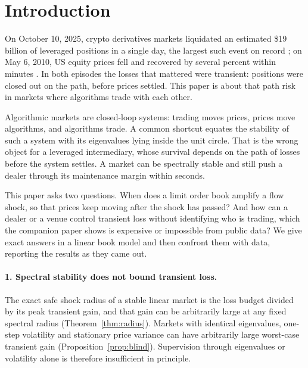 \documentclass[12pt]{article}
\theoremstyle{definition}
\theoremstyle{remark}
\begin{document}
\section{Introduction}

On October 10, 2025, crypto derivatives markets liquidated an estimated \$19 billion of leveraged positions in a single day, the largest such event on record \citep{shares2025}; on May 6, 2010, US equity prices fell and recovered by several percent within minutes \citep{kirilenko2017}. In both episodes the losses that mattered were transient: positions were closed out on the path, before prices settled. This paper is about that path risk in markets where algorithms trade with each other.

Algorithmic markets are closed-loop systems: trading moves prices, prices move algorithms, and algorithms trade. A common shortcut equates the stability of such a system with its eigenvalues lying inside the unit circle. That is the wrong object for a leveraged intermediary, whose survival depends on the path of losses before the system settles. A market can be spectrally stable and still push a dealer through its maintenance margin within seconds.

This paper asks two questions. When does a limit order book amplify a flow shock, so that prices keep moving after the shock has passed? And how can a dealer or a venue control transient loss without identifying who is trading, which the companion paper \citep{niroula2026} shows is expensive or impossible from public data? We give exact answers in a linear book model and then confront them with data, reporting the results as they came out.

\paragraph{1. Spectral stability does not bound transient loss.} The exact safe shock radius of a stable linear market is the loss budget divided by its peak transient gain, and that gain can be arbitrarily large at any fixed spectral radius (Theorem~\ref{thm:radius}). Markets with identical eigenvalues, one-step volatility and stationary price variance can have arbitrarily large worst-case transient gain (Proposition~\ref{prop:blind}). Supervision through eigenvalues or volatility alone is therefore insufficient in principle.
\end{document}
